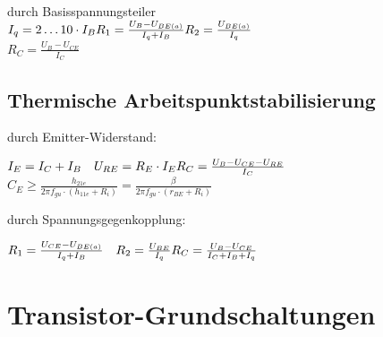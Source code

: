     \begin{minipage}{0.5\columnwidth}
        durch Basisspannungsteiler\\
        $I_q=2\dots 10\cdot I_B\\
        R_1=\frac{U_B-U_{BE(a)}}{I_q+I_B}\\
        R_2=\frac{U_{BE(a)}}{I_q}$\\
        $R_C=\frac{U_B-U_{CE}}{I_C}$
    \end{minipage}
    \begin{minipage}{0.5\columnwidth}
    \end{minipage}

    \subsection{Thermische Arbeitspunktstabilisierung}
    \begin{minipage}{0.5\columnwidth}
        durch Emitter-Widerstand:

        $I_E=I_C+I_B\quad U_{RE}=R_E\cdot I_E\\R_C=\frac{U_B-U_{CE}-U_{RE}}{I_C}$\\ %
        $C_E\geq\frac{h_{21e}}{2\pi f_{gu}\cdot(h_{11e}+R_i)}=\frac{\beta}{2\pi f_{gu}\cdot(r_{BE}+R_i)}$ %

    \end{minipage}
    \begin{minipage}{0.5\columnwidth}
        durch Spannungsgegenkopplung:

        $R_1=\frac{U_{CE}-U_{BE(a)}}{I_q+I_B}\quad R_2=\frac{U_{BE}}{I_q}\\
        R_C=\frac{U_B-U_{CE}}{I_C+I_B+I_q}$ 

    \end{minipage}

    \section{Transistor-Grundschaltungen}
